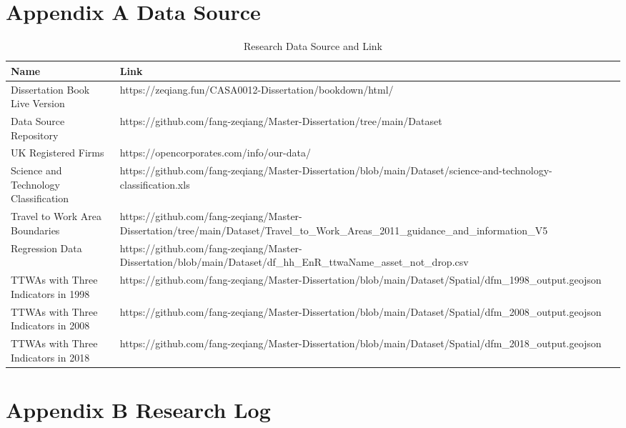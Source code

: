 \documentclass[
  12pt,
  oneside]{book}
\begin{document}
\printbibliography

\hypertarget{appendix-a-data-source}{%
\chapter*{Appendix A Data Source}\label{appendix-a-data-source}}


\begin{longtable}[t]{>{\raggedright\arraybackslash}p{4.5cm}>{\raggedright\arraybackslash}p{8.5cm}}
\caption{\label{tab:data-source}Research Data Source and Link}\\
\toprule
\textbf{Name} & \textbf{Link}\\
\midrule
Dissertation Book Live Version & https://zeqiang.fun/CASA0012-Dissertation/bookdown/html/\\
Data Source Repository & https://github.com/fang-zeqiang/Master-Dissertation/tree/main/Dataset\\
UK Registered Firms & https://opencorporates.com/info/our-data/\\
Science and Technology Classification & https://github.com/fang-zeqiang/Master-Dissertation/blob/main/Dataset/science-and-technology-classification.xls\\
Travel to Work Area Boundaries & https://github.com/fang-zeqiang/Master-Dissertation/tree/main/Dataset/Travel\_to\_Work\_Areas\_2011\_guidance\_and\_information\_V5\\
\addlinespace
Regression Data & https://github.com/fang-zeqiang/Master-Dissertation/blob/main/Dataset/df\_hh\_EnR\_ttwaName\_asset\_not\_drop.csv\\
TTWAs with Three Indicators in 1998 & https://github.com/fang-zeqiang/Master-Dissertation/blob/main/Dataset/Spatial/dfm\_1998\_output.geojson\\
TTWAs with Three Indicators in 2008 & https://github.com/fang-zeqiang/Master-Dissertation/blob/main/Dataset/Spatial/dfm\_2008\_output.geojson\\
TTWAs with Three Indicators in 2018 & https://github.com/fang-zeqiang/Master-Dissertation/blob/main/Dataset/Spatial/dfm\_2018\_output.geojson\\
\bottomrule
\end{longtable}

\hypertarget{appendix-b-research-log}{%
\chapter*{Appendix B Research Log}\label{appendix-b-research-log}}
\end{document}
